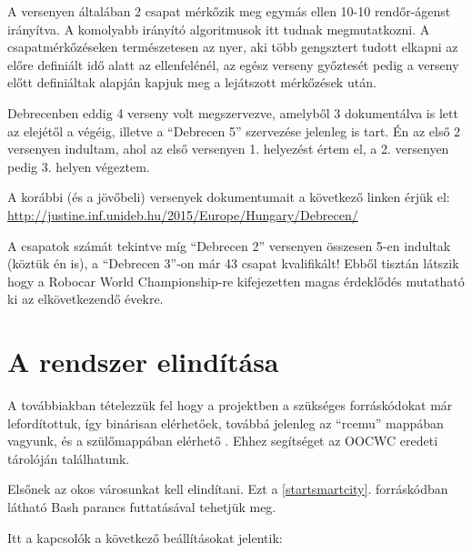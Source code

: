 \documentclass[a4paper,12pt]{report}
\begin{document}
\vspace{2mm}
A versenyen általában 2 csapat mérkőzik meg egymás ellen 10-10 rendőr-ágenst irányítva. A komolyabb irányító algoritmusok itt tudnak megmutatkozni. A csapatmérkőzéseken természetesen az nyer, aki több gengsztert tudott elkapni az előre definiált idő alatt az ellenfelénél, az egész verseny győztesét pedig a verseny előtt definiáltak alapján kapjuk meg a lejátszott mérkőzések után.

\vspace{2mm}
Debrecenben eddig 4 verseny volt megszervezve, amelyből 3 dokumentálva is lett az elejétől a végéig, illetve a ``Debrecen 5'' szervezése jelenleg is tart. Én az első 2 versenyen indultam, ahol az első versenyen 1. helyezést értem el, a 2. versenyen pedig 3. helyen végeztem.

\vspace{2mm}
A korábbi (és a jövőbeli) versenyek dokumentumait a következő linken érjük el: \url{http://justine.inf.unideb.hu/2015/Europe/Hungary/Debrecen/}

\vspace{2mm}
A csapatok számát tekintve míg ``Debrecen 2'' versenyen összesen 5-en indultak (köztük én is), a ``Debrecen 3''-on már 43 csapat kvalifikált! Ebből tisztán látszik hogy a Robocar World Championship-re kifejezetten magas érdeklődés mutatható ki az elkövetkezendő évekre.

\section{A rendszer elindítása}
\label{howtostart}

A továbbiakban tételezzük fel hogy a projektben a szükséges forráskódokat már lefordítottuk, így binárisan elérhetőek, továbbá jelenleg az ``rcemu'' mappában vagyunk, és a szülőmappában elérhető . Ehhez segítséget az OOCWC eredeti tárolóján \cite{oocwcrepo} találhatunk.

\vspace{2mm}
Elsőnek az okos városunkat kell elindítani. Ezt a \ref{startsmartcity}. forráskódban látható Bash parancs futtatásával  tehetjük meg.



Itt a kapcsolók a következő beállításokat jelentik:
\end{document}
